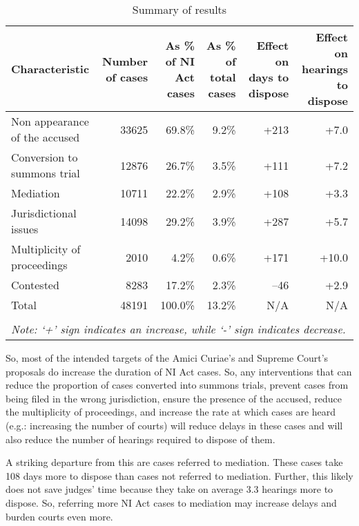 \documentclass[11pt,a4paper]{article}
\begin{document}
{\footnotesize \begin{longtable}{@{}p{2.5cm}rrrrr}
 \caption{Summary of results}\label{tab:summary_results}\\
 \toprule
 \textbf{Characteristic} & \multicolumn{1}{p{2cm}}{\textbf{Number of cases}} &
 \multicolumn{1}{p{2cm}}{\textbf{As \% of NI Act cases}}
 & \multicolumn{1}{p{2cm}}{\textbf{As \% of total cases}}
 & \multicolumn{1}{p{2cm}}{\textbf{Effect on days to dispose}} &
 \multicolumn{1}{p{2cm}}{\textbf{Effect on hearings to dispose}}
 \\
 \midrule
 Non appearance of the accused & 33625 & 69.8\% & 9.2\% & +213 & +7.0 \\ \midrule
 Conversion to summons trial & 12876 & 26.7\% & 3.5\% & +111 & +7.2 \\ \midrule
 Mediation & 10711 & 22.2\% & 2.9\% & +108 & +3.3 \\ \midrule
 Jurisdictional issues & 14098 & 29.2\% & 3.9\% & +287 & +5.7 \\ \midrule
 Multiplicity of proceedings & 2010 & 4.2\% & 0.6\% & +171 & +10.0 \\ \midrule
 Contested & 8283 & 17.2\% & 2.3\% & --46 & +2.9 \\ \midrule
 Total & 48191 & 100.0\% & 13.2\% & N/A & N/A \\
 \bottomrule
 \\
 \multicolumn{6}{l}{{\footnotesize \emph{Note: `+' sign
 indicates an increase, while `-' sign indicates decrease.}}}\\
\end{longtable}
}

So, most of the intended targets of the Amici Curiae's and Supreme Court's proposals do increase the duration of NI Act cases. So, any interventions that can reduce the proportion of cases converted into summons trials, prevent cases from being filed in the wrong jurisdiction, ensure the presence of the accused, reduce the multiplicity of proceedings, and increase the rate at which cases are heard (e.g.: increasing the number of courts) will reduce delays in these cases and will also reduce the number of hearings required to dispose of them.

A striking departure from this are cases referred to mediation. These cases take 108 days more to dispose than cases not referred to mediation. Further, this likely does not save judges' time because they take on average 3.3 hearings more to dispose. So, referring more NI Act cases to mediation may increase delays and burden courts even more.
\end{document}
